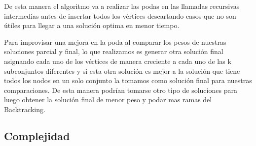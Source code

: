 De esta manera el algoritmo va a realizar las podas en las llamadas recursivas intermedias antes de insertar todos los vértices descartando casos que no son útiles para llegar  a una solución optima en menor tiempo.

Para improvisar una mejora en la poda al comparar los pesos de nuestras soluciones parcial y final, lo que realizamos es generar otra solución final asignando cada uno de los vértices de manera creciente a cada uno de las k subconjuntos diferentes y si esta otra solución es mejor a la solución que tiene todos los nodos en un solo conjunto la tomamos como solución final para nuestras comparaciones.
De esta manera podrían tomarse otro tipo de soluciones para luego obtener la solución final de menor peso y podar mas ramas del Backtracking.	


\subsection{Complejidad}
